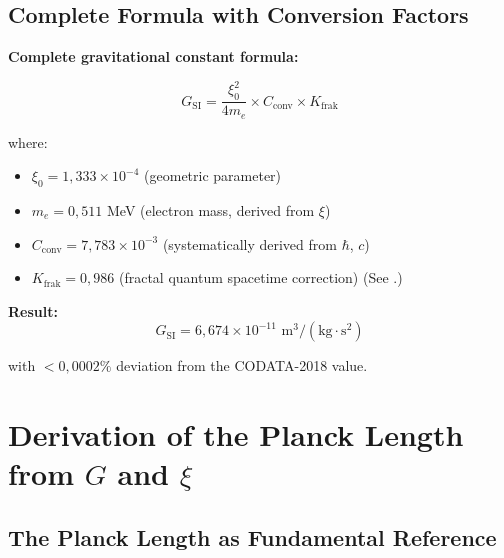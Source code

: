 	\subsection{Complete Formula with Conversion Factors}
	
	\begin{keyresult}
		\textbf{Complete gravitational constant formula:}
		
		\begin{equation}
			\boxed{G_{\text{SI}} = \frac{\xi_0^2}{4 m_e} \times C_{\text{conv}} \times K_{\text{frak}}}
			\label{eq:G_complete}
		\end{equation}
		
		where:
		\begin{itemize}
			\item $\xi_0 = 1{,}333 \times 10^{-4}$ (geometric parameter)
			\item $m_e = 0{,}511$ MeV (electron mass, derived from $\xi$)
			\item $C_{\text{conv}} = 7{,}783 \times 10^{-3}$ (systematically derived from $\hbar$, $c$)
			\item $K_{\text{frak}} = 0{,}986$ (fractal quantum spacetime correction) (See \cite{fractal_correction_derivation_En}.)
		\end{itemize}
		
		\textbf{Result:}
		\begin{equation}
			G_{\text{SI}} = 6{,}674 \times 10^{-11} \text{ m}^3/(\text{kg}\cdot\text{s}^2)
		\end{equation}
		
		with $<0{,}0002\%$ deviation from the CODATA-2018 value.
	\end{keyresult}
	
	\section{Derivation of the Planck Length from $G$ and $\xi$}
	
	\subsection{The Planck Length as Fundamental Reference}
	
